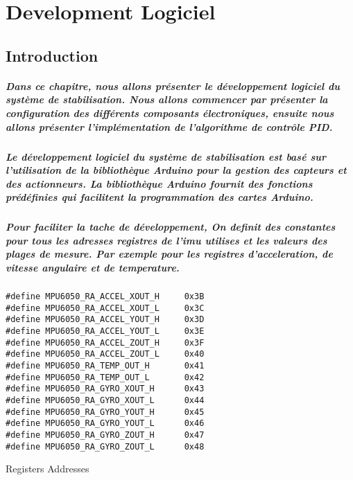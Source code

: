 \chapter{Development Logiciel}
\label{cp:implementation}

\section{Introduction}

\paragraph{Dans ce chapitre, nous allons présenter le développement logiciel du système de stabilisation. Nous allons commencer par présenter la configuration des différents composants électroniques, ensuite nous allons présenter l'implémentation de l'algorithme de contrôle PID.}

\paragraph{Le développement logiciel du système de stabilisation est basé sur l'utilisation de la bibliothèque Arduino pour la gestion des capteurs et des actionneurs. La bibliothèque Arduino fournit des fonctions prédéfinies qui facilitent la programmation des cartes Arduino.}

\paragraph{
	Pour faciliter la tache de développement, On definit des constantes pour tous les adresses registres de l'\gls{imu} utilises et les valeurs des plages de mesure. Par exemple pour les registres d'acceleration, de vitesse angulaire et de temperature.
}
\paragraph*{}
\begin{listing}[!htpb]
	\begin{verbatim}
#define MPU6050_RA_ACCEL_XOUT_H     0x3B
#define MPU6050_RA_ACCEL_XOUT_L     0x3C
#define MPU6050_RA_ACCEL_YOUT_H     0x3D
#define MPU6050_RA_ACCEL_YOUT_L     0x3E
#define MPU6050_RA_ACCEL_ZOUT_H     0x3F
#define MPU6050_RA_ACCEL_ZOUT_L     0x40
#define MPU6050_RA_TEMP_OUT_H       0x41
#define MPU6050_RA_TEMP_OUT_L       0x42
#define MPU6050_RA_GYRO_XOUT_H      0x43
#define MPU6050_RA_GYRO_XOUT_L      0x44
#define MPU6050_RA_GYRO_YOUT_H      0x45
#define MPU6050_RA_GYRO_YOUT_L      0x46
#define MPU6050_RA_GYRO_ZOUT_H      0x47
#define MPU6050_RA_GYRO_ZOUT_L      0x48
	\end{verbatim}
	\caption{Registers Addresses}
	\label{listing:registers-addresses}
\end{listing}


